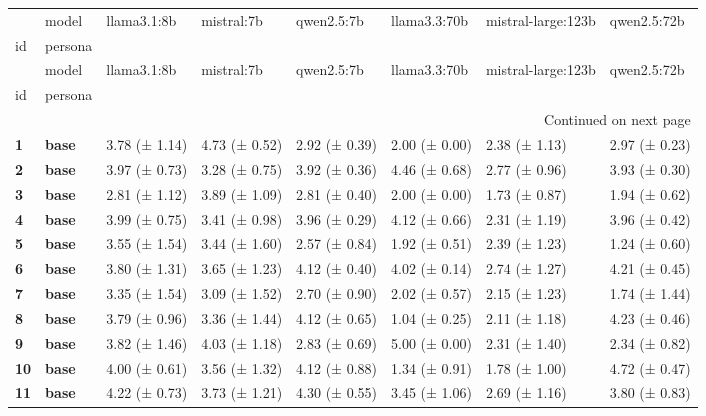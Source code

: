 \begin{longtable}{llllllll}
\toprule
 & model & llama3.1:8b & mistral:7b & qwen2.5:7b & llama3.3:70b & mistral-large:123b & qwen2.5:72b \\
id & persona &  &  &  &  &  &  \\
\midrule
\endfirsthead
\toprule
 & model & llama3.1:8b & mistral:7b & qwen2.5:7b & llama3.3:70b & mistral-large:123b & qwen2.5:72b \\
id & persona &  &  &  &  &  &  \\
\midrule
\endhead
\midrule
\multicolumn{8}{r}{Continued on next page} \\
\midrule
\endfoot
\bottomrule
\endlastfoot
\textbf{1} & \textbf{base} & 3.78 (± 1.14) & 4.73 (± 0.52) & 2.92 (± 0.39) & 2.00 (± 0.00) & 2.38 (± 1.13) & 2.97 (± 0.23) \\
\cline{1-8}
\textbf{2} & \textbf{base} & 3.97 (± 0.73) & 3.28 (± 0.75) & 3.92 (± 0.36) & 4.46 (± 0.68) & 2.77 (± 0.96) & 3.93 (± 0.30) \\
\cline{1-8}
\textbf{3} & \textbf{base} & 2.81 (± 1.12) & 3.89 (± 1.09) & 2.81 (± 0.40) & 2.00 (± 0.00) & 1.73 (± 0.87) & 1.94 (± 0.62) \\
\cline{1-8}
\textbf{4} & \textbf{base} & 3.99 (± 0.75) & 3.41 (± 0.98) & 3.96 (± 0.29) & 4.12 (± 0.66) & 2.31 (± 1.19) & 3.96 (± 0.42) \\
\cline{1-8}
\textbf{5} & \textbf{base} & 3.55 (± 1.54) & 3.44 (± 1.60) & 2.57 (± 0.84) & 1.92 (± 0.51) & 2.39 (± 1.23) & 1.24 (± 0.60) \\
\cline{1-8}
\textbf{6} & \textbf{base} & 3.80 (± 1.31) & 3.65 (± 1.23) & 4.12 (± 0.40) & 4.02 (± 0.14) & 2.74 (± 1.27) & 4.21 (± 0.45) \\
\cline{1-8}
\textbf{7} & \textbf{base} & 3.35 (± 1.54) & 3.09 (± 1.52) & 2.70 (± 0.90) & 2.02 (± 0.57) & 2.15 (± 1.23) & 1.74 (± 1.44) \\
\cline{1-8}
\textbf{8} & \textbf{base} & 3.79 (± 0.96) & 3.36 (± 1.44) & 4.12 (± 0.65) & 1.04 (± 0.25) & 2.11 (± 1.18) & 4.23 (± 0.46) \\
\cline{1-8}
\textbf{9} & \textbf{base} & 3.82 (± 1.46) & 4.03 (± 1.18) & 2.83 (± 0.69) & 5.00 (± 0.00) & 2.31 (± 1.40) & 2.34 (± 0.82) \\
\cline{1-8}
\textbf{10} & \textbf{base} & 4.00 (± 0.61) & 3.56 (± 1.32) & 4.12 (± 0.88) & 1.34 (± 0.91) & 1.78 (± 1.00) & 4.72 (± 0.47) \\
\cline{1-8}
\textbf{11} & \textbf{base} & 4.22 (± 0.73) & 3.73 (± 1.21) & 4.30 (± 0.55) & 3.45 (± 1.06) & 2.69 (± 1.16) & 3.80 (± 0.83) \\

\end{longtable}
